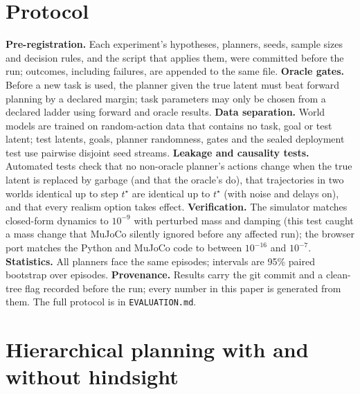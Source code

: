 \documentclass[11pt]{article}
\begin{document}
\section{Protocol}
\label{sec:protocol}
\textbf{Pre-registration.} Each experiment's hypotheses, planners, seeds, sample sizes and decision rules, and the
script that applies them, were committed before the run; outcomes, including failures, are appended to the same file.
\textbf{Oracle gates.} Before a new task is used, the planner given the true latent must beat forward planning by a
declared margin; task parameters may only be chosen from a declared ladder using forward and oracle results.
\textbf{Data separation.} World models are trained on random-action data that contains no task, goal or test
latent; test latents, goals, planner randomness, gates and the sealed deployment test use pairwise disjoint seed
streams. \textbf{Leakage and causality tests.} Automated tests check that no non-oracle planner's actions change when
the true latent is replaced by garbage (and that the oracle's do), that trajectories in two worlds identical up to step
$t^\star$ are identical up to $t^\star$ (with noise and delays on), and that every realism option takes effect.
\textbf{Verification.} The simulator matches closed-form dynamics to $10^{-9}$ with perturbed mass and damping (this test
caught a mass change that MuJoCo silently ignored before any affected run); the browser port matches the Python and
MuJoCo code to between $10^{-16}$ and $10^{-7}$. \textbf{Statistics.} All planners face the same episodes; intervals are
95\% paired bootstrap over episodes. \textbf{Provenance.} Results carry the git commit and a clean-tree flag recorded
before the run; every number in this paper is generated from them. The full protocol is in \texttt{EVALUATION.md}.

\section{Hierarchical planning with and without hindsight}
\label{sec:hier}
\end{document}
